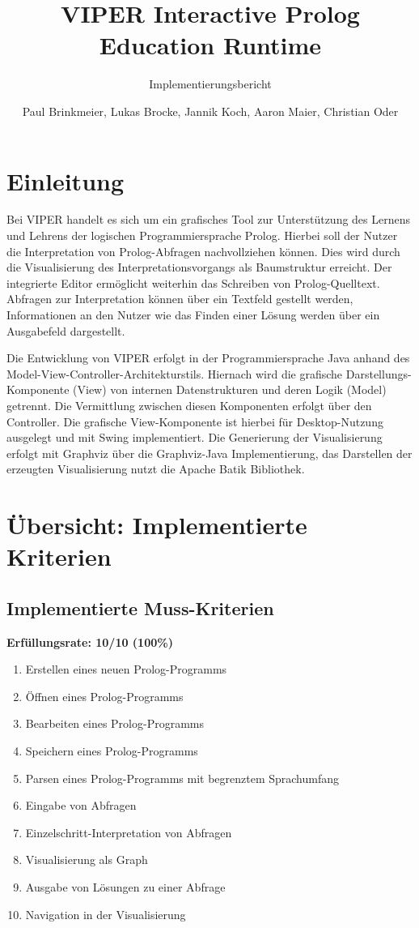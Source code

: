 \documentclass[parskip=full,11pt,twoside]{scrartcl}
\title{VIPER Interactive Prolog Education Runtime}
\subtitle{Implementierungsbericht}
\author{Paul Brinkmeier, Lukas Brocke, Jannik Koch, Aaron Maier, Christian Oder}
\newcommand{\cmark}{\ding{51}}%
\begin{document}
\maketitle
\tableofcontents

\section{Einleitung}
\setcounter{page}{1}

Bei VIPER handelt es sich um ein grafisches Tool zur Unterstützung des Lernens und Lehrens der logischen Programmiersprache Prolog. Hierbei soll der Nutzer die Interpretation von Prolog-Abfragen nachvollziehen können. Dies wird durch die Visualisierung des Interpretationsvorgangs als Baumstruktur erreicht. Der integrierte Editor ermöglicht weiterhin das Schreiben von Prolog-Quelltext. Abfragen zur Interpretation können über ein Textfeld gestellt werden, Informationen an den Nutzer wie das Finden einer Lösung werden über ein Ausgabefeld dargestellt.

Die Entwicklung von VIPER erfolgt in der Programmiersprache Java anhand des Model-View-Controller-Architekturstils. Hiernach wird die grafische Darstellungs-Komponente (View) von internen Datenstrukturen und deren Logik (Model) getrennt. Die Vermittlung zwischen diesen Komponenten erfolgt über den Controller. Die grafische View-Komponente ist hierbei für Desktop-Nutzung ausgelegt und mit Swing implementiert. Die Generierung der Visualisierung erfolgt mit Graphviz über die Graphviz-Java Implementierung, das Darstellen der erzeugten Visualisierung nutzt die Apache Batik Bibliothek.

\section{Übersicht: Implementierte Kriterien}

\subsection{Implementierte Muss-Kriterien}
	\textbf{Erfüllungsrate: 10/10 (100\%)}
	\begin{enumerate}[label=\textbf{M\arabic*}]
		\item Erstellen eines neuen Prolog-Programms\hfill\cmark
		\item Öffnen eines Prolog-Programms\hfill\cmark
		\item Bearbeiten eines Prolog-Programms\hfill\cmark
		\item Speichern eines Prolog-Programms\hfill\cmark
		\item Parsen eines Prolog-Programms mit begrenztem Sprachumfang\hfill\cmark
		\item Eingabe von Abfragen\hfill\cmark
		\item Einzelschritt-Interpretation von Abfragen\hfill\cmark
		\item Visualisierung als Graph\hfill\cmark
		\item Ausgabe von Lösungen zu einer Abfrage\hfill\cmark
		\item Navigation in der Visualisierung\hfill\cmark
	\end{enumerate}
\end{document}
